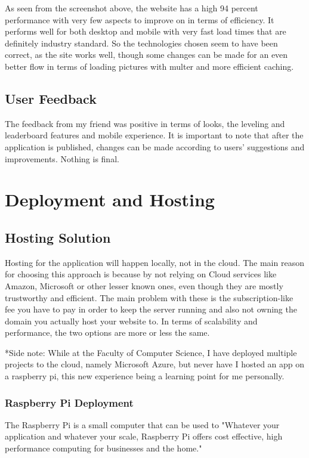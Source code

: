\documentclass[12pt,a4paper]{report}
\begin{document}
As seen from the screenshot above, the website has a high 94 percent performance with very few aspects to improve on in terms of efficiency. It performs well for both desktop and mobile with very fast load times that are definitely industry standard. So the technologies chosen seem to have been correct, as the site works well, though some changes can be made for an even better flow in terms of loading pictures with multer and more efficient caching.

\section{User Feedback}

The feedback from my friend was positive in terms of looks, the leveling and leaderboard features and mobile experience. It is important to note that after the application is published, changes can be made according to users' suggestions and improvements. Nothing is final.

\chapter{Deployment and Hosting}
\section{Hosting Solution}

Hosting for the application will happen locally, not in the cloud. The main reason for choosing this approach is because by not relying on Cloud services like Amazon, Microsoft or other lesser known ones, even though they are mostly trustworthy and efficient. The main problem with these is the subscription-like fee you have to pay in order to keep the server running and also not owning the domain you actually host your website to. In terms of scalability and performance, the two options are more or less the same.

*Side note: While at the Faculty of Computer Science, I have deployed multiple projects to the cloud, namely Microsoft Azure, but never have I hosted an app on a raspberry pi, this new experience being a learning point for me personally.

\subsection{Raspberry Pi Deployment}
The Raspberry Pi is a small computer that can be used to 
"Whatever your application and whatever your scale, Raspberry Pi offers cost effective, high performance computing for businesses and the home."~\cite{raspberryPi}
\end{document}
